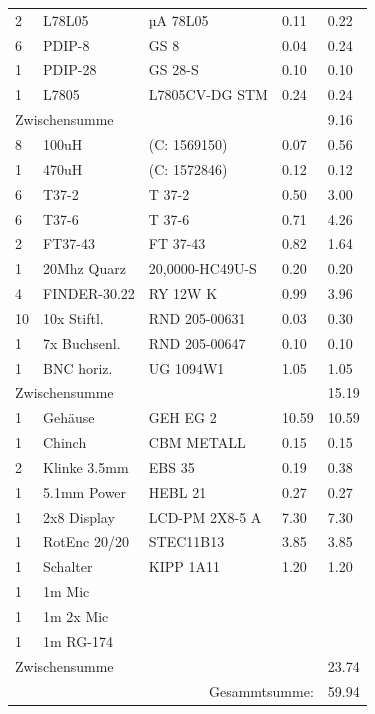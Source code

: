 \documentclass[10pt, a4paper]{paper}
\begin{document}
\begin{longtable}{|p{}|p{}|p{}|p{}|p{}|}
 2 & L78L05       & µA 78L05        & 0.11  & 0.22 \\
 6 & PDIP-8       & GS 8            & 0.04  & 0.24 \\
 1 & PDIP-28      & GS 28-S         & 0.10  & 0.10 \\
 1 & L7805        & L7805CV-DG STM  & 0.24  & 0.24 \\ \hline
 \multicolumn{4}{|l|}{Zwischensumme}        & 9.16 \\ \hline
 8 & 100uH        & (C: 1569150)    & 0.07  & 0.56 \\
 1 & 470uH        & (C: 1572846)    & 0.12  & 0.12 \\
 6 & T37-2        & T 37-2          & 0.50  & 3.00 \\
 6 & T37-6        & T 37-6          & 0.71  & 4.26 \\
 2 & FT37-43      & FT 37-43        & 0.82  & 1.64 \\
 1 & 20Mhz Quarz  & 20,0000-HC49U-S & 0.20  & 0.20 \\ 
 4 & FINDER-30.22 & RY 12W K        & 0.99  & 3.96 \\ 
10 & 10x Stiftl.  & RND 205-00631   & 0.03  & 0.30 \\
 1 & 7x Buchsenl. & RND 205-00647   & 0.10  & 0.10 \\
 1 & BNC horiz.   & UG 1094W1       & 1.05  & 1.05 \\ \hline
 \multicolumn{4}{|l|}{Zwischensumme}        & 15.19 \\ \hline
 1 & Gehäuse      & GEH EG 2        & 10.59 & 10.59 \\
 1 & Chinch       & CBM METALL      & 0.15  & 0.15 \\ 
 2 & Klinke 3.5mm & EBS 35          & 0.19  & 0.38 \\
 1 & 5.1mm Power  & HEBL 21         & 0.27  & 0.27 \\
 1 & 2x8 Display  & LCD-PM 2X8-5 A  & 7.30  & 7.30 \\ 
 1 & RotEnc 20/20 & STEC11B13       & 3.85  & 3.85 \\
 1 & Schalter     & KIPP 1A11       & 1.20  & 1.20 \\
 1 & 1m Mic       & & & \\
 1 & 1m 2x Mic    & & & \\
 1 & 1m RG-174    & & & \\ \hline 
 \multicolumn{4}{|l|}{Zwischensumme}        & 23.74 \\ \hline \hline
 \multicolumn{4}{|r|}{Gesammtsumme:}        & 59.94 \\ \hline
\end{longtable}









\end{document}
